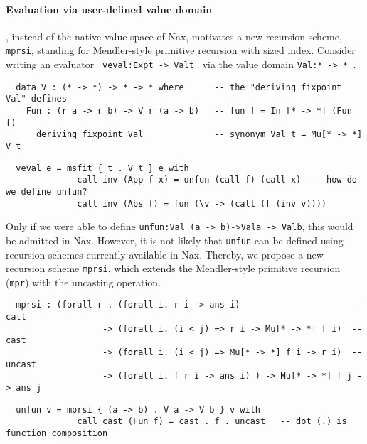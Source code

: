 \documentclass[a4paper]{easychair} %
\newcommand{\mprsi}[0]{\texttt{mprsi}}
\begin{document}
\paragraph{Evaluation via user-defined value domain\!\!\!\!\!}, instead of
the native value space of Nax, motivates a new recursion scheme,
\mprsi, standing for Mendler-style primitive recursion with sized index.
Consider writing an evaluator \texttt{\,veval\;:\;Exp\;t\,->\,Val\;t\,}
via the value domain \texttt{Val\;:\;*\,->\,*\,}.\vspace*{-.5ex}
{\small
\begin{verbatim}
  data V : (* -> *) -> * -> * where      -- the "deriving fixpoint Val" defines
    Fun : (r a -> r b) -> V r (a -> b)   -- fun f = In [* -> *] (Fun f)
      deriving fixpoint Val              -- synonym Val t = Mu[* -> *] V t
\end{verbatim}\vspace*{-1.5ex}
\begin{verbatim}
  veval e = msfit { t . V t } e with
              call inv (App f x) = unfun (call f) (call x)  -- how do we define unfun?
              call inv (Abs f) = fun (\v -> (call (f (inv v))))
\end{verbatim} }
\noindent
Only if we were able to define
\texttt{unfun\;:\;Val\,(a\,->\,b)\;->\;Val\;a\,->\,Val\;b},
this would be admitted in Nax.
However, it is not likely that \texttt{unfun} can be defined using
recursion schemes currently available in Nax. Thereby, we propose
a new recursion scheme \mprsi, which extends the Mendler-style primitive recursion
(\texttt{mpr}) with the uncasting operation.\vspace*{-.5ex}
{\small
\begin{verbatim}
  mprsi : (forall r . (forall i. r i -> ans i)                      -- call
                   -> (forall i. (i < j) => r i -> Mu[* -> *] f i)  -- cast   
                   -> (forall i. (i < j) => Mu[* -> *] f i -> r i)  -- uncast 
                   -> (forall i. f r i -> ans i) ) -> Mu[* -> *] f j -> ans j
\end{verbatim}\vspace*{-1.5ex}
\begin{verbatim}
  unfun v = mprsi { (a -> b) . V a -> V b } v with
              call cast (Fun f) = cast . f . uncast   -- dot (.) is function composition
\end{verbatim} }\vspace*{-.5ex}
\end{document}
